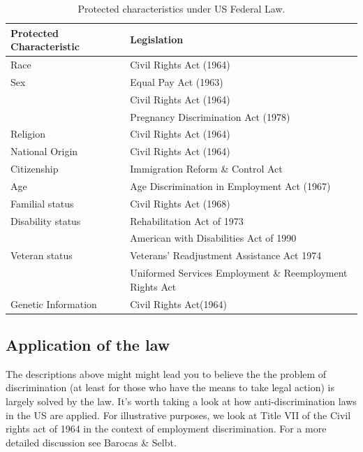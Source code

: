 \begin{table}[h!]
\centering
\caption{Protected characteristics under US Federal Law.}
\label{tab_ProtChar}
\vspace{10pt}
\begin{tabular}{|l|l|}
\hline
Protected Characteristic & Legislation                                 \\
\hline
\hline
Race                     & Civil Rights Act (1964)                     \\
\hline
Sex                      & Equal Pay Act (1963)                        \\
                         & Civil Rights Act (1964)                     \\
                         & Pregnancy Discrimination Act (1978)         \\
\hline
Religion                 & Civil Rights Act (1964)                     \\
\hline
National Origin          & Civil Rights Act (1964)                     \\
\hline
Citizenship              & Immigration Reform \& Control Act           \\
\hline
Age                      & Age Discrimination in Employment Act (1967) \\
\hline
Familial status          & Civil Rights Act (1968)                     \\
\hline
Disability status        & Rehabilitation Act of 1973                  \\
                         & American with Disabilities Act of 1990      \\
\hline
Veteran status           & Veterans' Readjustment Assistance Act 1974  \\
           & Uniformed Services Employment \& Reemployment Rights Act  \\
\hline
Genetic Information & Civil Rights Act(1964) \\
\hline
\end{tabular}
\end{table}

\subsection{Application of the law} \label{sec_AppLaw}

The descriptions above might might lead you to believe the the problem of discrimination (at least for those who have the means to take legal action) is largely solved by the law. It's worth taking a look at how anti-discrimination laws in the US are applied. For illustrative purposes, we look at Title VII of the Civil rights act of 1964 in the context of employment discrimination. For a more detailed discussion see Barocas \& Selbt\cite{BarocasSelbst}.

